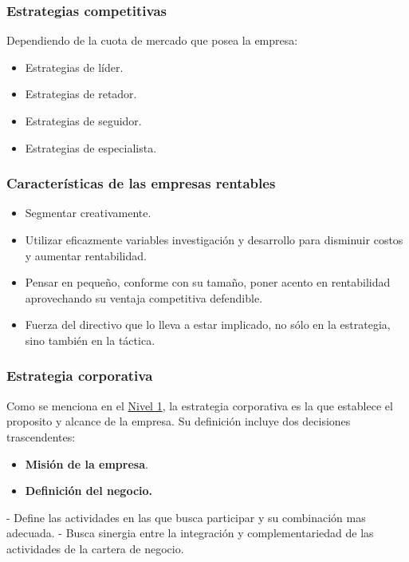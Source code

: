 \documentclass{templateNote}
\begin{document}
\subsubsection{Estrategias competitivas}
\noindent Dependiendo de la cuota de mercado que posea la empresa:
\begin{itemize}
    \item Estrategias de líder.
    
    \item Estrategias de retador.
    
    \item Estrategias de seguidor.
    
    \item Estrategias de especialista.
\end{itemize}

\subsubsection{Características de las empresas rentables}
\begin{itemize}
    \item Segmentar creativamente.
    
    \item Utilizar eficazmente variables investigación y desarrollo para disminuir costos y aumentar rentabilidad.
    
    \item Pensar en pequeño, conforme con su tamaño, poner acento en rentabilidad aprovechando su ventaja competitiva defendible.
    
    \item Fuerza del directivo que lo lleva a estar implicado, no sólo en la estrategia, sino también en la táctica.
\end{itemize}

\subsubsection{Estrategia corporativa}
\noindent Como se menciona en el \hyperlink{estrategia_corporativa}{Nivel 1}, la estrategia corporativa es la que establece el proposito y alcance de la empresa.
Su definición incluye dos decisiones trascendentes:
\begin{itemize}
    \item \textbf{Misión de la empresa}.
    
    \item \textbf{Definición del negocio.}
\end{itemize}
- Define las actividades en las que busca participar y su combinación mas adecuada.
- Busca sinergia entre la integración y complementariedad de las actividades de la cartera de negocio.
\end{document}
